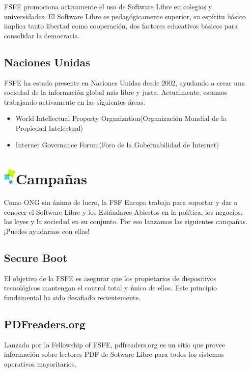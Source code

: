 \documentclass[10pt,foldmark,tumble]{leaflet}
\begin{document}
    FSFE promociona activamente el uso de Software Libre en colegios y universidades. El Software Libre es pedagógicamente superior, su espíritu básico implica tanto libertad como cooperación, dos factores educativos básicos para consolidar la democracia.
    
\subsection{Naciones Unidas}

    FSFE ha estado presente en Naciones Unidas desde 2002, ayudando a crear una sociedad de la información global más libre y justa. Actualmente, estamos trabajando activamente en las siguientes áreas:
    
    \begin{itemize}
    \item World Intellectual Property Organization(Organización Mundial de la Propiedad Intelectual)
    \item Internet Governance Forum(Foro de la Gobernabilidad de Internet)
    \end{itemize}

\section{\includegraphics{item.png}Campañas}

Como ONG sin ánimo de lucro, la FSF Europa trabaja para soportar y dar a conocer el Software Libre y los Estándares Abiertos en la política, los negocios, las leyes y la sociedad en su conjunto. Por eso lanzamos las siguientes campañas. ¡Puedes ayudarnos con ellas!

\subsection{Secure Boot}

    El objetivo de la FSFE es asegurar que los propietarios de dispositivos tecnológicos mantengan el control total y único de ellos. Este principio fundamental ha sido desafiado recientemente.

\subsection{PDFreaders.org}

    Lanzado por la Fellowship of FSFE, pdfreaders.org es un sitio que provee información sobre lectores PDF de Sotware Libre para todos los sistemas operativos mayoritarios.
    
\end{document}
